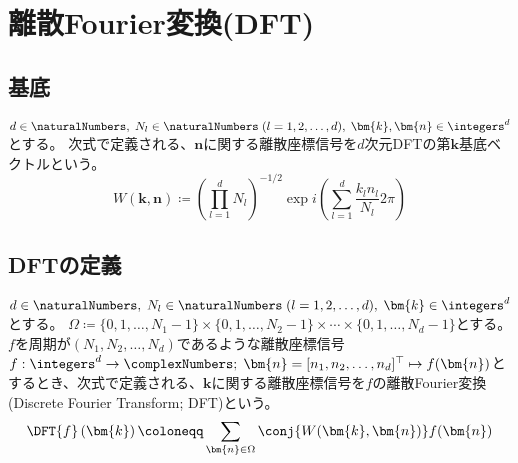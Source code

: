 \chapter{離散Fourier変換(DFT)}
    \newcommand{\DFTwithArg}[2]{\DFT{#1}\left(#2\right)}
    \section{基底}
        $d\in\naturalNumbers,\;N_l\in\naturalNumbers\;(l=1,2,\dots,d),\;\bm{k},\bm{n}\in\integers^d$とする。
        次式で定義される、$\bm{n}$に関する離散座標信号を$d$次元DFTの第$\bm{k}$基底ベクトルという。
        \[ W(\bm{k},\bm{n}) \coloneqq \left(\prod_{l=1}^d N_l\right)^{-1/2} \exp i\left(\sum_{l=1}^d \frac{k_l n_l}{N_l}2\pi\right)\]

    \section{DFTの定義}
        \label{DFTの定義}
        $d\in\naturalNumbers,\;N_l\in\naturalNumbers\;(l=1,2,\dots,d),\;\bm{k}\in\integers^d$とする。
        $\Omega \coloneqq \{0,1,\dots,N_1-1\}\times\{0,1,\dots,N_2-1\}\times\cdots\times\{0,1,\dots,N_d-1\}$とする。
        $f$を周期が$(N_1,N_2,\dots,N_d)$であるような離散座標信号$f: \integers^d\to\complexNumbers;\;\bm{n} = [n_1,n_2,\dots,n_d]^\top \mapsto f(\bm{n})$とするとき、次式で定義される、$\bm{k}$に関する離散座標信号を$f$の離散Fourier変換(Discrete Fourier Transform; DFT)という。
        \[ \DFTwithArg{f}{\bm{k}} \coloneqq \sum_{\bm{n}\in\Omega} \conj{W(\bm{k},\bm{n})} f(\bm{n}) \]

